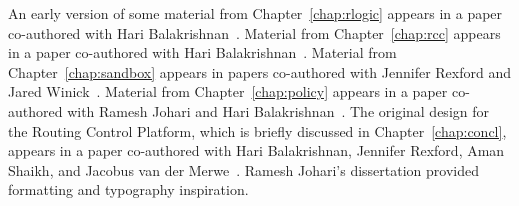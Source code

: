 \noindent
An early version of some material from Chapter~\ref{chap:rlogic} appears
in a paper co-authored with Hari Balakrishnan~\cite{Feamster2003b}.
Material from Chapter~\ref{chap:rcc} appears in a paper co-authored with
Hari Balakrishnan~\cite{Feamster2004h}.  Material from
Chapter~\ref{chap:sandbox} appears in papers co-authored with Jennifer
Rexford and Jared Winick~\cite{Feamster2002b, Feamster2004}.  Material
from Chapter~\ref{chap:policy} appears in a paper co-authored with
Ramesh Johari and Hari Balakrishnan~\cite{Feamster2005b}.  
The original design for the Routing Control Platform, which is briefly
discussed in Chapter~\ref{chap:concl}, appears in a paper co-authored
with Hari Balakrishnan, Jennifer Rexford, Aman Shaikh, and Jacobus van
der Merwe~\cite{feamster:fdna2004}.  Ramesh Johari's dissertation
provided formatting and typography inspiration.





